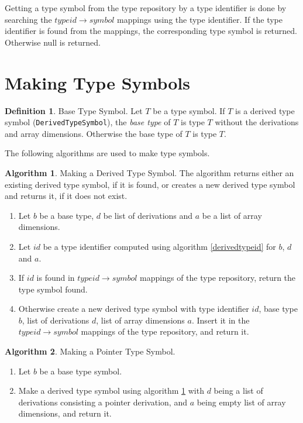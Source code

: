 \documentclass[a4paper,oneside,11pt]{book}
\theoremstyle{definition}
\newtheorem{algo}{Algorithm}[section]
\newtheorem{defn}{Definition}[section]
\begin{document}
Getting a type symbol from the type repository by a type identifier is done by searching the $typeid \rightarrow symbol$ mappings using the type identifier.
If the type identifier is found from the mappings, the corresponding type symbol is returned. Otherwise null is returned.

\section{Making Type Symbols}

\begin{defn} Base Type Symbol.
Let $T$ be a type symbol.
If $T$ is a derived type symbol (\verb|DerivedTypeSymbol|), the \emph{base type} of $T$ is type $T$ without the derivations and array dimensions.
Otherwise the base type of $T$ is type $T$.
\end{defn}

The following algorithms are used to make type symbols.

\begin{algo}\label{makederivedtype} Making a Derived Type Symbol.
The algorithm returns either an existing derived type symbol, if it is found,
or creates a new derived type symbol and returns it, if it does not exist.
\begin{enumerate}
\item
Let $b$ be a base type, $d$ be list of derivations and $a$ be a list of array dimensions.
\item
Let $id$ be a type identifier computed using algorithm \ref{derivedtypeid} for $b$, $d$ and $a$.
\item
If $id$ is found in $type id \rightarrow symbol$ mappings of the type repository, return the type symbol found.
\item
Otherwise create a new derived type symbol with type identifier $id$, base type $b$, list of derivations $d$, list of array dimensions $a$.
Insert it in the $type id \rightarrow symbol$ mappings of the type repository, and return it.
\end{enumerate}
\end{algo}

\begin{algo}\label{makepointertype} Making a Pointer Type Symbol.
\begin{enumerate}
\item
Let $b$ be a base type symbol.
\item
Make a derived type symbol using algorithm \ref{makederivedtype} with $d$ being a list of derivations consisting a pointer derivation,
and $a$ being empty list of array dimensions, and return it.
\end{enumerate}
\end{algo}
\end{document}
